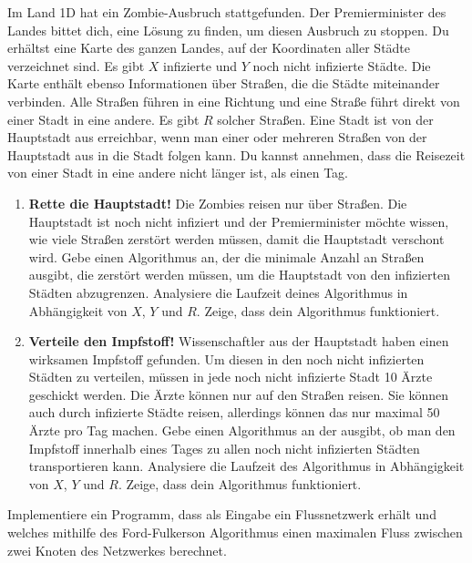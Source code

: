 \documentclass{uebung_cs}
\begin{document}
\begin{aufgabe}
    Im Land 1D hat ein Zombie-Ausbruch stattgefunden. Der Premierminister des Landes bittet dich, eine Lösung zu finden, um diesen Ausbruch zu stoppen. Du erhältst eine Karte des ganzen Landes, auf der Koordinaten aller Städte verzeichnet sind. Es gibt $X$ infizierte und $Y$ noch nicht infizierte Städte. Die Karte enthält ebenso Informationen über Straßen, die die Städte miteinander verbinden. Alle Straßen führen in eine Richtung und eine Straße führt direkt von einer Stadt in eine andere. Es gibt $R$ solcher Straßen. Eine Stadt ist von der Hauptstadt aus erreichbar, wenn man einer oder mehreren Straßen von der Hauptstadt aus in die Stadt folgen kann. Du kannst annehmen, dass die Reisezeit von einer Stadt in eine andere nicht länger ist, als einen Tag.
    \begin{enumerate}
        \item \textbf{Rette die Hauptstadt!} Die Zombies reisen nur über Straßen. Die Hauptstadt ist noch nicht infiziert und der Premierminister möchte wissen, wie viele Straßen zerstört werden müssen, damit die Hauptstadt verschont wird. Gebe einen Algorithmus an, der die minimale Anzahl an Straßen ausgibt, die zerstört werden müssen, um die Hauptstadt von den infizierten Städten abzugrenzen. Analysiere die Laufzeit deines Algorithmus in Abhängigkeit von $X$, $Y$ und $R$. Zeige, dass dein Algorithmus funktioniert. \\
        \item \textbf{Verteile den Impfstoff!} Wissenschaftler aus der Hauptstadt haben einen wirksamen Impfstoff gefunden. Um diesen in den noch nicht infizierten Städten zu verteilen, müssen in jede noch nicht infizierte Stadt 10 Ärzte geschickt werden. Die Ärzte können nur auf den Straßen reisen. Sie können auch durch infizierte Städte reisen, allerdings können das nur maximal 50 Ärzte pro Tag machen. Gebe einen Algorithmus an der ausgibt, ob man den Impfstoff innerhalb eines Tages zu allen noch nicht infizierten Städten transportieren kann. Analysiere die Laufzeit des Algorithmus in Abhängigkeit von $X$, $Y$ und $R$. Zeige, dass dein Algorithmus funktioniert.
    \end{enumerate}
\end{aufgabe}

\begin{aufgabe}
    Implementiere ein Programm, dass als Eingabe ein Flussnetzwerk erhält und welches mithilfe des Ford-Fulkerson Algorithmus einen maximalen Fluss zwischen zwei Knoten des Netzwerkes berechnet.
\end{aufgabe}
\end{document}
